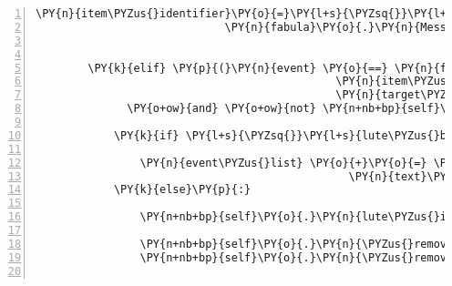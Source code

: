 \begin{Verbatim}[commandchars=\\\{\},numbers=left,firstnumber=1,stepnumber=1]
                                                                 \PY{n}{item\PYZus{}identifier}\PY{o}{=}\PY{l+s}{\PYZsq{}}\PY{l+s}{lute}\PY{l+s}{\PYZsq{}}\PY{p}{)}\PY{p}{]}\PY{p}{)}\PY{p}{,}
                             \PY{n}{fabula}\PY{o}{.}\PY{n}{Message}\PY{p}{(}\PY{p}{[}\PY{n}{fabula}\PY{o}{.}\PY{n}{PerceptionEvent}\PY{p}{(}\PY{n}{identifier}\PY{o}{=}\PY{n}{ID\PYZus{}CASSANDRA}\PY{p}{,}
                                                                    \PY{n}{perception}\PY{o}{=}\PY{l+s}{\PYZsq{}}\PY{l+s}{Kuni hat die Laute eingesteckt.}\PY{l+s}{\PYZsq{}}\PY{p}{)}\PY{p}{]}\PY{p}{)}\PY{p}{]}

        \PY{k}{elif} \PY{p}{(}\PY{n}{event} \PY{o}{==} \PY{n}{fabula}\PY{o}{.}\PY{n}{TriesToDropEvent}\PY{p}{(}\PY{n}{identifier}\PY{o}{=}\PY{n}{ID\PYZus{}KUNI}\PY{p}{,}
                                              \PY{n}{item\PYZus{}identifier}\PY{o}{=}\PY{l+s}{\PYZsq{}}\PY{l+s}{string\PYZus{}harp}\PY{l+s}{\PYZsq{}}\PY{p}{,}
                                              \PY{n}{target\PYZus{}identifier}\PY{o}{=}\PY{n}{ID\PYZus{}CASSANDRA}\PY{p}{)}
              \PY{o+ow}{and} \PY{o+ow}{not} \PY{n+nb+bp}{self}\PY{o}{.}\PY{n}{lute\PYZus{}is\PYZus{}repaired}\PY{p}{)}\PY{p}{:}

            \PY{k}{if} \PY{l+s}{\PYZsq{}}\PY{l+s}{lute\PYZus{}broken}\PY{l+s}{\PYZsq{}} \PY{o+ow}{not} \PY{o+ow}{in} \PY{n+nb+bp}{self}\PY{o}{.}\PY{n}{host}\PY{o}{.}\PY{n}{rack}\PY{o}{.}\PY{n}{entity\PYZus{}dict}\PY{o}{.}\PY{n}{keys}\PY{p}{(}\PY{p}{)}\PY{p}{:}

                \PY{n}{event\PYZus{}list} \PY{o}{+}\PY{o}{=} \PY{p}{[}\PY{n}{fabula}\PY{o}{.}\PY{n}{SaysEvent}\PY{p}{(}\PY{n}{identifier}\PY{o}{=}\PY{n}{ID\PYZus{}CASSANDRA}\PY{p}{,}
                                                \PY{n}{text}\PY{o}{=}\PY{l+s}{\PYZsq{}}\PY{l+s}{Ich besitze nichts, wofür man eine Saite gebrauchen könnte.}\PY{l+s}{\PYZsq{}}\PY{p}{)}\PY{p}{]}
            \PY{k}{else}\PY{p}{:}

                \PY{n+nb+bp}{self}\PY{o}{.}\PY{n}{lute\PYZus{}is\PYZus{}repaired} \PY{o}{=} \PY{n+nb+bp}{True}

                \PY{n+nb+bp}{self}\PY{o}{.}\PY{n}{\PYZus{}remove\PYZus{}sentence}\PY{p}{(}\PY{n}{ID\PYZus{}CASSANDRA}\PY{p}{,} \PY{l+s}{\PYZsq{}}\PY{l+s}{Ich habe eine Laute. Leider ist sie kaputt.}\PY{l+s}{\PYZsq{}}\PY{p}{)}
                \PY{n+nb+bp}{self}\PY{o}{.}\PY{n}{\PYZus{}remove\PYZus{}sentence}\PY{p}{(}\PY{n}{ID\PYZus{}KUNI}\PY{p}{,} \PY{l+s}{\PYZsq{}}\PY{l+s}{Ich habe eine Saite von einer Harfe.}\PY{l+s}{\PYZsq{}}\PY{p}{)}


\end{Verbatim}

